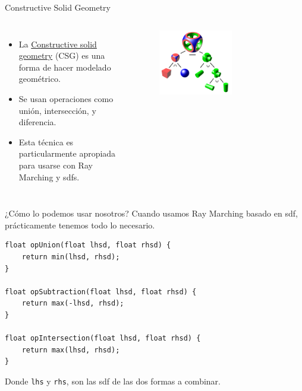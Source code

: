 \begin{frame}{Constructive Solid Geometry}

\begin{columns}
\begin{itemize}
    \item La \href{https://en.wikipedia.org/wiki/Constructive_solid_geometry}{Constructive solid geometry} (CSG) es una forma de hacer modelado geométrico.
    \item Se usan operaciones como unión, intersección, y diferencia.
    \item Esta técnica es particularmente apropiada para usarse con Ray Marching y sdfs.
\end{itemize}
        \begin{figure}[htb]
            \centering
            \includegraphics[width=0.6\textwidth]{img/cgsTree}
        \end{figure}
\end{columns}

\end{frame}

\begin{frame}[fragile]{¿Cómo lo podemos usar nosotros?}
Cuando usamos Ray Marching basado en sdf, prácticamente tenemos todo lo necesario.
\begin{listing}
\begin{verbatim}
float opUnion(float lhsd, float rhsd) {
    return min(lhsd, rhsd);
}

float opSubtraction(float lhsd, float rhsd) {
    return max(-lhsd, rhsd);
}

float opIntersection(float lhsd, float rhsd) {
    return max(lhsd, rhsd);
}
\end{verbatim}
\end{listing}
Donde \texttt{lhs} y \texttt{rhs}, son las sdf de las dos formas a combinar.
\end{frame}


